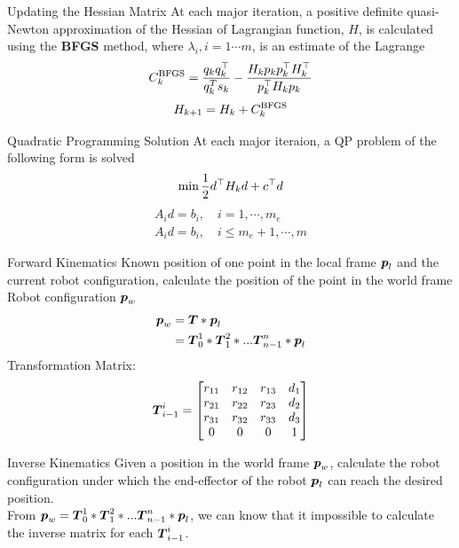 \documentclass[10pt, compress]{beamer}
\begin{document}
\begin{frame}[fragile]{Updating the Hessian Matrix}
At each major iteration, a positive definite quasi-Newton approximation of the Hessian of Lagrangian function, $H$, is calculated using the \textbf{BFGS} method, where $\lambda_i, i = 1\cdots m$, is an estimate of the Lagrange
$$C_k^{\rm BFGS} = {q_kq_k^\top \over q_k^T s_k} - {H_k p_k p_k^\top H_k^\top \over p_k^\top H_k p_k}$$
$$H_{k+1} = H_{k} + C_k^{\rm BFGS}$$
\end{frame}

\begin{frame}[fragile]{Quadratic Programming Solution}
At each major iteraion, a QP problem of the following form is solved
$$\min {1 \over 2} d^\top H_k d + c^\top d$$
\begin{eqnarray*}
A_i d = b_i, \quad i = 1,\cdots , m_e \\
A_i d = b_i, \quad i \leq m_e + 1,\cdots , m
\end{eqnarray*}
\end{frame}

\begin{frame}[fragile]{Forward Kinematics}
Known position of one point in the local frame $\mbox{\boldmath $p$}_l$ and the current robot configuration, calculate the position of the point in the world frame Robot configuration $\mbox{\boldmath $p$}_w$\\
\[
\begin{split}
\mbox{\boldmath $p$}_w &=\mbox{\boldmath $T$} * \mbox{\boldmath $p$}_l \\
&= \mbox{\boldmath $T$}_0^1 * \mbox{\boldmath $T$}_1^2* ... \mbox{\boldmath $T$}_{n-1}^n * \mbox{\boldmath $p$}_l 
\end{split}
\]
Transformation Matrix:
\[
\mbox{\boldmath $T$}_{i-1}^{i}=
 \left[
 \begin{matrix}
   r_{11} & r_{12} & r_{13} & d_1\\
   r_{21} & r_{22} & r_{23} & d_2 \\
   r_{31} & r_{32} & r_{33} & d_3 \\
   0& 0 & 0 & 1
  \end{matrix}
  \right] 
\]
\end{frame}

\begin{frame}[fragile]{Inverse Kinematics}
Given a position in the world frame $\mbox{\boldmath $p$}_w$, calculate the robot configuration under which the end-effector of the robot $\mbox{\boldmath $p$}_l$ can reach the desired position. \\ 

From  $\mbox{\boldmath $p$}_w =\mbox{\boldmath $T$}_0^1 * \mbox{\boldmath $T$}_1^2* ... \mbox{\boldmath $T$}_{n-1}^n * \mbox{\boldmath $p$}_l$, we can know that it impossible to calculate the inverse matrix for each $\mbox{\boldmath $T$}_{i-1}^{i}$. 

\end{frame}
\end{document}
